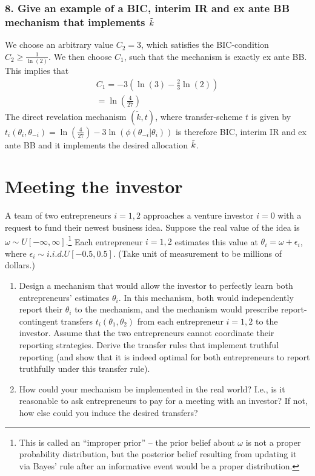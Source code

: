 \documentclass[a4paper]{article}
\begin{document}
	\subsubsection*{8. Give an example of a BIC, interim IR and ex ante BB mechanism that implements $\Tilde{k}$}
	We choose an arbitrary value $C_2=3$, which satisfies the BIC-condition $C_2\geq \frac{1}{\ln(2)}$. We then choose $C_1$, such that the mechanism is exactly ex ante BB. This implies that 
	\begin{align}
		C_1=-3(\ln(3)-\frac{2}{3}\ln(2))\nonumber\\
		=\ln(\frac{4}{27})
	\end{align}
	The direct revelation mechanism $(\tilde{k},t)$, where transfer-scheme $t$ is given by $t_i(\theta_i,\theta_{-i})=\ln(\frac{4}{27})-3\ln(\phi(\theta_{-i}|\theta_{i}))$ is therefore BIC, interim IR and ex ante BB and it implements the desired allocation $\Tilde{k}$.

\fi




\section{Meeting the investor}
A team of two entrepreneurs $i=1,2$ approaches a venture investor $i=0$ with a request to fund their newest business idea. Suppose the real value of the idea is $\omega \sim U[-\infty, \infty]$.\footnote{This is called an ``improper prior'' -- the prior belief about $\omega$ is not a proper probability distribution, but the posterior belief resulting from updating it via Bayes' rule after an informative event would be a proper distribution.}
Each entrepreneur $i=1,2$ estimates this value at $\theta_i = \omega + \epsilon_i$, where $\epsilon_i \sim i.i.d.U[-0.5,0.5]$. (Take unit of measurement to be millions of dollars.)

\begin{enumerate}
	\item Design a mechanism that would allow the investor to perfectly learn both entrepreneurs' estimates $\theta_i$. In this mechanism, both would independently report their $\theta_i$ to the mechanism, and the mechanism would prescribe report-contingent transfers $t_i(\theta_1,\theta_2)$ from each entrepreneur $i=1,2$ to the investor. Assume that the two entrepreneurs cannot coordinate their reporting strategies. Derive the transfer rules that implement truthful reporting (and show that it is indeed optimal for both entrepreneurs to report truthfully under this transfer rule).
	
	\item How could your mechanism be implemented in the real world? I.e., is it reasonable to ask entrepreneurs to pay for a meeting with an investor? If not, how else could you induce the desired transfers?
\end{enumerate}
\end{document}
